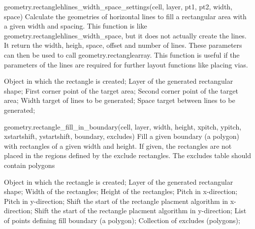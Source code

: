 \begin{APIfunc}{geometry.rectanglehlines\_width\_space\_settings(cell, layer, pt1, pt2, width, space)}
    Calculate the geometries of horizontal lines to fill a rectangular area with a given width and spacing. This function is like geometry.rectanglehlines\_width\_space, but it does not actually create the lines. It return the width, heigh, space, offset and number of lines. These parameters can then be used to call geometry.rectanglearray. This function is useful if the parameters of the lines are required for further layout functions like placing vias.
    \begin{APIparameters}
            Object in which the rectangle is created;
            Layer of the generated rectangular shape;
            First corner point of the target area;
            Second corner point of the target area;
            Width target of lines to be generated;
            Space target between lines to be generated;
    \end{APIparameters}
\end{APIfunc}
\begin{APIfunc}{geometry.rectangle\_fill\_in\_boundary(cell, layer, width, height, xpitch, ypitch, xstartshift, ystartshift, boundary, excludes)}
    Fill a given boundary (a polygon) with rectangles of a given width and height. If given, the rectangles are not placed in the regions defined by the exclude rectangles. The excludes table should contain polygons
    \begin{APIparameters}
            Object in which the rectangle is created;
            Layer of the generated rectangular shape;
            Width of the rectangles;
            Height of the rectangles;
            Pitch in x-direction;
            Pitch in y-direction;
            Shift the start of the rectangle placment algorithm in x-direction;
            Shift the start of the rectangle placment algorithm in y-direction;
            List of points defining fill boundary (a polygon);
            Collection of excludes (polygons);
    \end{APIparameters}
\end{APIfunc}
